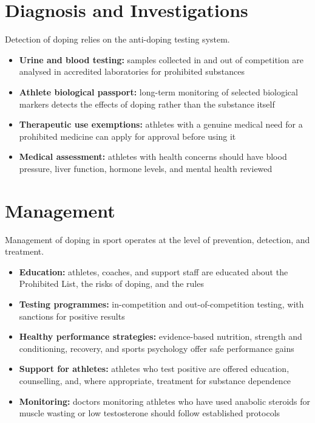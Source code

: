 \section*{Diagnosis and Investigations}
Detection of doping relies on the anti-doping testing system.
\begin{itemize}
    \item \textbf{Urine and blood testing:} samples collected in and out of competition are analysed in accredited laboratories for prohibited substances
    \item \textbf{Athlete biological passport:} long-term monitoring of selected biological markers detects the effects of doping rather than the substance itself
    \item \textbf{Therapeutic use exemptions:} athletes with a genuine medical need for a prohibited medicine can apply for approval before using it
    \item \textbf{Medical assessment:} athletes with health concerns should have blood pressure, liver function, hormone levels, and mental health reviewed
\end{itemize}

\section*{Management}
Management of doping in sport operates at the level of prevention, detection, and treatment.
\begin{itemize}
    \item \textbf{Education:} athletes, coaches, and support staff are educated about the Prohibited List, the risks of doping, and the rules
    \item \textbf{Testing programmes:} in-competition and out-of-competition testing, with sanctions for positive results
    \item \textbf{Healthy performance strategies:} evidence-based nutrition, strength and conditioning, recovery, and sports psychology offer safe performance gains
    \item \textbf{Support for athletes:} athletes who test positive are offered education, counselling, and, where appropriate, treatment for substance dependence
    \item \textbf{Monitoring:} doctors monitoring athletes who have used anabolic steroids for muscle wasting or low testosterone should follow established protocols
\end{itemize}

